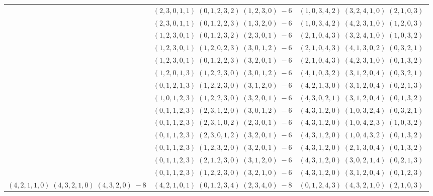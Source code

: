 \documentclass[11pt]{article}
\begin{document}
\begin{longtable}[l]{|c|c|c|}
 \cline{2-3} 
 & $(2 ,3 ,0 ,1 ,1) \;(0 ,1 ,2 ,3 ,2) \;(1 ,2 ,3 ,0) \;-6$ & $(1 ,0 ,3 ,4 ,2) \;(3 ,2 ,4 ,1 ,0) \;(2 ,1 ,0 ,3) \;$\\ 
 \cline{2-3} 
 & $(2 ,3 ,0 ,1 ,1) \;(0 ,1 ,2 ,2 ,3) \;(1 ,3 ,2 ,0) \;-6$ & $(1 ,0 ,3 ,4 ,2) \;(4 ,2 ,3 ,1 ,0) \;(1 ,2 ,0 ,3) \;$\\ 
 \cline{2-3} 
 & $(1 ,2 ,3 ,0 ,1) \;(0 ,1 ,2 ,3 ,2) \;(2 ,3 ,0 ,1) \;-6$ & $(2 ,1 ,0 ,4 ,3) \;(3 ,2 ,4 ,1 ,0) \;(1 ,0 ,3 ,2) \;$\\ 
 \cline{2-3} 
 & $(1 ,2 ,3 ,0 ,1) \;(1 ,2 ,0 ,2 ,3) \;(3 ,0 ,1 ,2) \;-6$ & $(2 ,1 ,0 ,4 ,3) \;(4 ,1 ,3 ,0 ,2) \;(0 ,3 ,2 ,1) \;$\\ 
 \cline{2-3} 
 & $(1 ,2 ,3 ,0 ,1) \;(0 ,1 ,2 ,2 ,3) \;(3 ,2 ,0 ,1) \;-6$ & $(2 ,1 ,0 ,4 ,3) \;(4 ,2 ,3 ,1 ,0) \;(0 ,1 ,3 ,2) \;$\\ 
 \cline{2-3} 
 & $(1 ,2 ,0 ,1 ,3) \;(1 ,2 ,2 ,3 ,0) \;(3 ,0 ,1 ,2) \;-6$ & $(4 ,1 ,0 ,3 ,2) \;(3 ,1 ,2 ,0 ,4) \;(0 ,3 ,2 ,1) \;$\\ 
 \cline{2-3} 
 & $(0 ,1 ,2 ,1 ,3) \;(1 ,2 ,2 ,3 ,0) \;(3 ,1 ,2 ,0) \;-6$ & $(4 ,2 ,1 ,3 ,0) \;(3 ,1 ,2 ,0 ,4) \;(0 ,2 ,1 ,3) \;$\\ 
 \cline{2-3} 
 & $(1 ,0 ,1 ,2 ,3) \;(1 ,2 ,2 ,3 ,0) \;(3 ,2 ,0 ,1) \;-6$ & $(4 ,3 ,0 ,2 ,1) \;(3 ,1 ,2 ,0 ,4) \;(0 ,1 ,3 ,2) \;$\\ 
 \cline{2-3} 
 & $(0 ,1 ,1 ,2 ,3) \;(2 ,3 ,1 ,2 ,0) \;(3 ,0 ,1 ,2) \;-6$ & $(4 ,3 ,1 ,2 ,0) \;(1 ,0 ,3 ,2 ,4) \;(0 ,3 ,2 ,1) \;$\\ 
 \cline{2-3} 
 & $(0 ,1 ,1 ,2 ,3) \;(2 ,3 ,1 ,0 ,2) \;(2 ,3 ,0 ,1) \;-6$ & $(4 ,3 ,1 ,2 ,0) \;(1 ,0 ,4 ,2 ,3) \;(1 ,0 ,3 ,2) \;$\\ 
 \cline{2-3} 
 & $(0 ,1 ,1 ,2 ,3) \;(2 ,3 ,0 ,1 ,2) \;(3 ,2 ,0 ,1) \;-6$ & $(4 ,3 ,1 ,2 ,0) \;(1 ,0 ,4 ,3 ,2) \;(0 ,1 ,3 ,2) \;$\\ 
 \cline{2-3} 
 & $(0 ,1 ,1 ,2 ,3) \;(1 ,2 ,3 ,2 ,0) \;(3 ,2 ,0 ,1) \;-6$ & $(4 ,3 ,1 ,2 ,0) \;(2 ,1 ,3 ,0 ,4) \;(0 ,1 ,3 ,2) \;$\\ 
 \cline{2-3} 
 & $(0 ,1 ,1 ,2 ,3) \;(2 ,1 ,2 ,3 ,0) \;(3 ,1 ,2 ,0) \;-6$ & $(4 ,3 ,1 ,2 ,0) \;(3 ,0 ,2 ,1 ,4) \;(0 ,2 ,1 ,3) \;$\\ 
 \cline{2-3} 
 & $(0 ,1 ,1 ,2 ,3) \;(1 ,2 ,2 ,3 ,0) \;(3 ,2 ,1 ,0) \;-6$ & $(4 ,3 ,1 ,2 ,0) \;(3 ,1 ,2 ,0 ,4) \;(0 ,1 ,2 ,3) \;$\\ \hline\multirow[t]{81}{*}{ $(4 ,2 ,1 ,1 ,0) \;(4 ,3 ,2 ,1 ,0) \;(4 ,3 ,2 ,0) \;-8$ }  & $(4 ,2 ,1 ,0 ,1) \;(0 ,1 ,2 ,3 ,4) \;(2 ,3 ,4 ,0) \;-8$ & $(0 ,1 ,2 ,4 ,3) \;(4 ,3 ,2 ,1 ,0) \;(2 ,1 ,0 ,3) \;$\\ 

\end{longtable}
\end{document}
